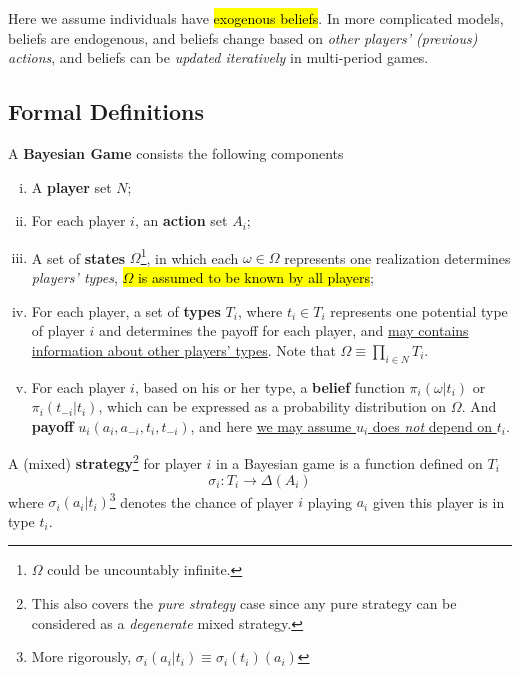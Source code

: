 \documentclass[11pt]{article}
\begin{document}
			\begin{remark}
				Here we assume individuals have \hl{exogenous beliefs}. In more complicated models, beliefs are endogenous, and beliefs change based on \emph{other players' (previous) actions}, and beliefs can be \emph{updated iteratively} in multi-period games.
			\end{remark}
		
		\subsection{Formal Definitions}
			\begin{definition} A \textbf{Bayesian Game} consists the following components
				\begin{enumerate}[(i)]
					\item A \textbf{player} set $N$;
					\item For each player $i$, an \textbf{action} set $A_i$;
					\item A set of \textbf{states} $\Omega$\footnote{$\Omega$ could be uncountably infinite.}, in which each $\omega \in \Omega$ represents one realization determines \emph{players' types}, \hl{$\Omega$ is assumed to be known by all players};
					\item For each player, a set of \textbf{types} $T_i$, where $t_i \in T_i$ represents one potential type of player $i$ and determines the payoff for each player, and \ul{may contains information about other players' types}. Note that $\Omega \equiv \prod_{i \in N} T_i$.
					\item For each player $i$, based on his or her type, a \textbf{belief} function $\pi_i(\omega|t_i)$ or $\pi_i(t_{-i}|t_i)$, which can be expressed as a probability distribution on $\Omega$. And \textbf{payoff} $u_i(a_i, a_{-i}, t_i, t_{-i})$, and here \ul{we may assume $u_i$ does \emph{not} depend on $t_i$}.
				\end{enumerate}
			\end{definition}
			
			\begin{definition}[Strategy]
				A (mixed) \textbf{strategy}\footnote{This also covers the \emph{pure strategy} case since any pure strategy can be considered as a \emph{degenerate} mixed strategy.} for player $i$ in a Bayesian game is a function defined on $T_i$
				\begin{equation}
					\sigma_i: T_i \to \Delta(A_i)
				\end{equation}
				where $\sigma_i(a_i|t_i)$\footnote{More rigorously, $\sigma_i(a_i|t_i) \equiv \sigma_i(t_i)(a_i)$} denotes the chance of player $i$ playing $a_i$ given this player is in type $t_i$.
			\end{definition}
			
\end{document}
